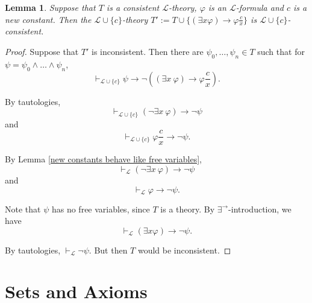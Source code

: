 \documentclass[a4paper, 11pt]{amsart}
\newtheorem{lemma}[lemma]{Lemma}
\theoremstyle{remark}
\newcommand{\cL}{\mathcal L}
\begin{document}
\begin{lemma} 
Suppose that $T$ is a consistent 
$\cL$-theory, $\varphi$ is an $\cL$-formula and $c$ is a new constant. 
Then the $\cL\cup \{c\}$-theory $T':= T\cup \{ (\exists x \varphi) \rightarrow \varphi \frac{c}{x} \}$ is $\cL\cup \{c\}$-consistent. 
\end{lemma} 
\begin{proof} 
Suppose that $T'$ is inconsistent. 
Then there are $\psi_0,\dots,\psi_n\in T$ such that for $\psi=\psi_0\wedge \dots \wedge \psi_n$, 
$$\vdash_{\cL\cup\{c\}} \psi \rightarrow \neg((\exists x\ \varphi) \rightarrow \varphi \frac{c}{x}) .$$ 

By tautologies,  
$$\vdash_{\cL\cup\{c\}} (\neg \exists x\ \varphi) \rightarrow \neg \psi $$ 
and 
$$\vdash_{\cL\cup\{c\}} \varphi \frac{c}{x} \rightarrow \neg \psi .$$ 

By Lemma \ref{new constants behave like free variables}, 
$$\vdash_\cL (\neg \exists x\ \varphi) \rightarrow \neg \psi $$ 
and 
$$\vdash_\cL \varphi \rightarrow \neg \psi .$$ 

Note that $\psi$ has no free variables, since $T$ is a theory. 
By $\exists^{\rightarrow}$-introduction, we have 
$$\vdash_\cL (\exists x \varphi) \rightarrow \neg \psi .$$ 

By tautologies,  $\vdash_\cL \neg \psi$. 
But then $T$ would be inconsistent. 
\end{proof} 



\fi 





















\newpage 





\section{Sets and Axioms} 
\end{document}

